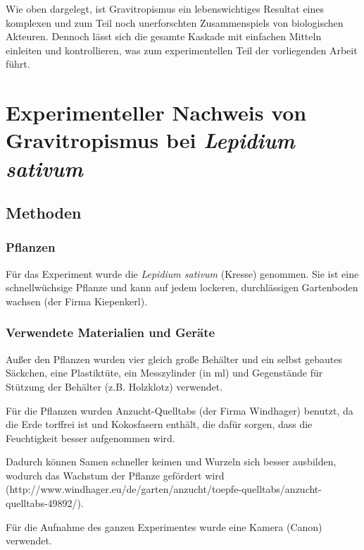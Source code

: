 \documentclass[
a4paper, 
11pt, 
ngerman,
listof=totoc,
bibliography=totocnumbered,
abstracton
]{scrreprt}
\begin{document}
 
Wie oben dargelegt, ist Gravitropismus ein lebenswichtiges Resultat eines komplexen und zum Teil noch unerforschten Zusammenspiels von biologischen Akteuren. Dennoch lässt sich die gesamte Kaskade mit einfachen Mitteln einleiten und kontrollieren, was zum experimentellen Teil der vorliegenden Arbeit führt. 














\chapter{Experimenteller Nachweis von Gravitropismus bei \emph{Lepidium sativum}}

\section{Methoden}

\subsection{Pflanzen}

Für das Experiment wurde die \emph{Lepidium sativum} (Kresse) genommen. Sie ist eine schnellwüchsige Pflanze und kann auf jedem lockeren, durchlässigen Gartenboden wachsen (der Firma Kiepenkerl).


\subsection{Verwendete Materialien und Geräte}

Außer den Pflanzen wurden vier gleich große Behälter und ein selbst gebautes Säckchen, eine Plastiktüte, ein Messzylinder (in ml) und Gegenstände für Stützung der Behälter (z.B. Holzklotz) verwendet.

Für die Pflanzen wurden Anzucht-Quelltabs (der Firma Windhager) benutzt, da die Erde torffrei ist und Kokosfasern enthält, die dafür sorgen, dass die Feuchtigkeit besser aufgenommen wird.

Dadurch können Samen schneller keimen und Wurzeln sich besser ausbilden, wodurch das Wachstum der Pflanze gefördert wird (http://www.windhager.eu/de/garten/anzucht/toepfe-quelltabs/anzucht-quelltabs-49892/). 

Für die Aufnahme des ganzen Experimentes wurde eine Kamera (Canon) verwendet.
\end{document}
